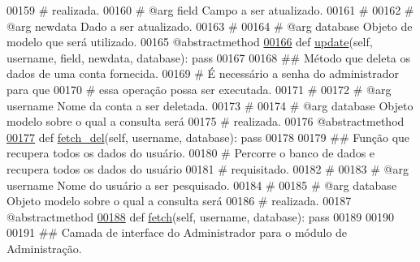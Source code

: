\begin{DoxyCode}
00159     \textcolor{comment}{#                       realizada.}
00160     \textcolor{comment}{#   @arg    field       Campo a ser atualizado.}
00161     \textcolor{comment}{#}
00162     \textcolor{comment}{#   @arg    newdata     Dado a ser atualizado.}
00163     \textcolor{comment}{#}
00164     \textcolor{comment}{#   @arg    database    Objeto de modelo que será utilizado.}
00165     @abstractmethod
\hypertarget{AdmUnit_8py_source_l00166}{}\hyperlink{classAdm_1_1AdmUnit_1_1IfPersAdm_a34acb7c8c60b0e90429cfbcc28424852}{00166}     \textcolor{keyword}{def }\hyperlink{classAdm_1_1AdmUnit_1_1IfPersAdm_a34acb7c8c60b0e90429cfbcc28424852}{update}(self, username, field, newdata, database): \textcolor{keyword}{pass}
00167 
00168     \textcolor{comment}{## Método que deleta os dados de uma conta fornecida.}
00169     \textcolor{comment}{#   É necessário a senha do administrador para que}
00170     \textcolor{comment}{#   essa operação possa ser executada.}
00171     \textcolor{comment}{#}
00172     \textcolor{comment}{#   @arg    username    Nome da conta a ser deletada.}
00173     \textcolor{comment}{#}
00174     \textcolor{comment}{#   @arg    database    Objeto modelo sobre o qual a consulta será}
00175     \textcolor{comment}{#                       realizada.}
00176     @abstractmethod
\hypertarget{AdmUnit_8py_source_l00177}{}\hyperlink{classAdm_1_1AdmUnit_1_1IfPersAdm_a6e9771c86560ed5b7d38fbf6bd40cec8}{00177}     \textcolor{keyword}{def }\hyperlink{classAdm_1_1AdmUnit_1_1IfPersAdm_a6e9771c86560ed5b7d38fbf6bd40cec8}{fetch\_del}(self, username, database): \textcolor{keyword}{pass}
00178 
00179     \textcolor{comment}{##  Função que recupera todos os dados do usuário.}
00180     \textcolor{comment}{#       Percorre o banco de dados e recupera todos os dados do usuário}
00181     \textcolor{comment}{#       requisitado.}
00182     \textcolor{comment}{#}
00183     \textcolor{comment}{#   @arg    username    Nome do usuário a ser pesquisado.}
00184     \textcolor{comment}{#}
00185     \textcolor{comment}{#   @arg    database    Objeto modelo sobre o qual a consulta será}
00186     \textcolor{comment}{#                       realizada.}
00187     @abstractmethod
\hypertarget{AdmUnit_8py_source_l00188}{}\hyperlink{classAdm_1_1AdmUnit_1_1IfPersAdm_ac439faae9802d9828eee269548ff2661}{00188}     \textcolor{keyword}{def }\hyperlink{classAdm_1_1AdmUnit_1_1IfPersAdm_ac439faae9802d9828eee269548ff2661}{fetch}(self, username, database): \textcolor{keyword}{pass}
00189 
00190 
00191 \textcolor{comment}{## Camada de interface do Administrador para o módulo de Administração.}

\end{DoxyCode}
